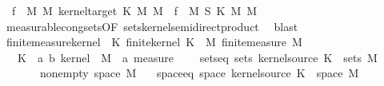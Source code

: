 \begin{isabellebody}
\ \ {\isachardoublequoteopen}f\ {\isasymin}\ M\ {\isasymOtimes}\isactrlsub M\ {\isacharparenleft}{\kern0pt}kernel{\isacharunderscore}{\kern0pt}target\ K{\isacharparenright}{\kern0pt}\ {\isasymrightarrow}\isactrlsub M\ M{\isacharprime}{\kern0pt}\ {\isasymlongleftrightarrow}\ f\ {\isasymin}\ M\ {\isasymOtimes}\isactrlsub S\ K\ {\isasymrightarrow}\isactrlsub M\ M{\isacharprime}{\kern0pt}{\isachardoublequoteclose}\isanewline
%
\isadelimproof
\ \ %
\endisadelimproof
%
\isatagproof
{}\isamarkupfalse%
\ measurable{\isacharunderscore}{\kern0pt}cong{\isacharunderscore}{\kern0pt}sets{\isacharbrackleft}{\kern0pt}OF\ sets{\isacharunderscore}{\kern0pt}kernel{\isacharunderscore}{\kern0pt}semidirect{\isacharunderscore}{\kern0pt}product{\isacharbrackright}{\kern0pt}\ \isamarkupfalse%
\ blast%
\endisatagproof
{\isafoldproof}%
%
\isadelimproof
\isanewline
%
\endisadelimproof
\isanewline
{}\isamarkupfalse%
\ finite{\isacharunderscore}{\kern0pt}measure{\isacharunderscore}{\kern0pt}kernel\ {\isacharequal}{\kern0pt}\ K{\isacharquery}{\kern0pt}{\isacharcolon}{\kern0pt}\ finite{\isacharunderscore}{\kern0pt}kernel\ K\ {\isacharplus}{\kern0pt}\ M{\isacharquery}{\kern0pt}{\isacharcolon}{\kern0pt}\ finite{\isacharunderscore}{\kern0pt}measure\ M\isanewline
\ \ \ K\ {\isacharcolon}{\kern0pt}{\isacharcolon}{\kern0pt}\ {\isachardoublequoteopen}{\isacharparenleft}{\kern0pt}{\isacharprime}{\kern0pt}a{\isacharcomma}{\kern0pt}\ {\isacharprime}{\kern0pt}b{\isacharparenright}{\kern0pt}\ kernel{\isachardoublequoteclose}\ \ M\ {\isacharcolon}{\kern0pt}{\isacharcolon}{\kern0pt}\ {\isachardoublequoteopen}{\isacharprime}{\kern0pt}a\ measure{\isachardoublequoteclose}\ {\isacharplus}{\kern0pt}\isanewline
\ \ \ sets{\isacharunderscore}{\kern0pt}eq{\isacharcolon}{\kern0pt}\ {\isachardoublequoteopen}sets\ {\isacharparenleft}{\kern0pt}kernel{\isacharunderscore}{\kern0pt}source\ K{\isacharparenright}{\kern0pt}\ {\isacharequal}{\kern0pt}\ sets\ M{\isachardoublequoteclose}\isanewline
\ \ \ \ \ \ \ nonempty{\isacharcolon}{\kern0pt}\ {\isachardoublequoteopen}space\ M\ {\isasymnoteq}\ {\isacharbraceleft}{\kern0pt}{\isacharbraceright}{\kern0pt}{\isachardoublequoteclose}\isanewline
{}\isanewline
\isanewline
{}\isamarkupfalse%
\ space{\isacharunderscore}{\kern0pt}eq{\isacharcolon}{\kern0pt}\ {\isachardoublequoteopen}space\ {\isacharparenleft}{\kern0pt}kernel{\isacharunderscore}{\kern0pt}source\ K{\isacharparenright}{\kern0pt}\ {\isacharequal}{\kern0pt}\ space\ M{\isachardoublequoteclose}\isanewline

\end{isabellebody}
